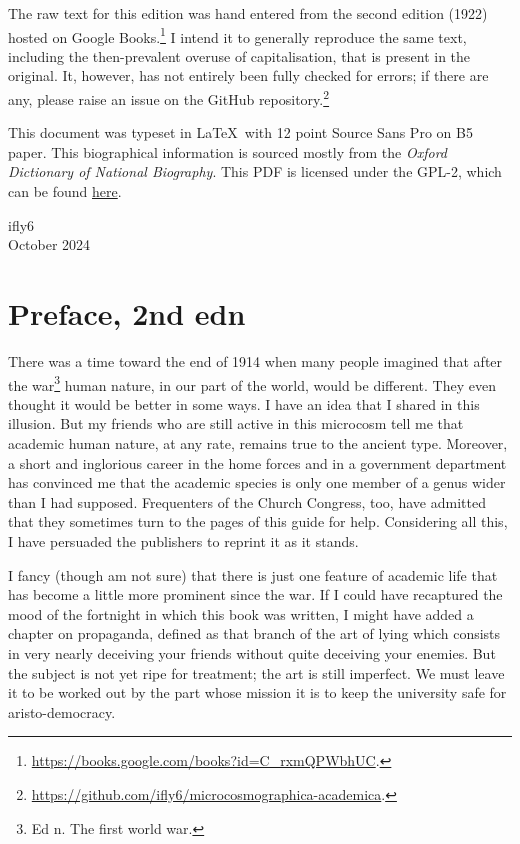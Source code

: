 \documentclass[12pt, oneside, b5paper]{memoir}
\begin{document}
The raw text for this edition was hand entered from the second edition (1922) hosted on Google Books.\footnote{\url{https://books.google.com/books?id=C_rxmQPWbhUC}.} I intend it to generally reproduce the same text, including the then-prevalent overuse of capitalisation, that is present in the original. It, however, has not entirely been fully checked for errors; if there are any, please raise an issue on the GitHub repository.\footnote{\url{https://github.com/ifly6/microcosmographica-academica}.}

This document was typeset in \LaTeX\ with 12 point Source Sans Pro on B5 paper. This biographical information is sourced mostly from the \emph{Oxford Dictionary of National Biography}. This PDF is licensed under the GPL-2, which can be found \href{https://github.com/ifly6/microcsmographica-academica/blob/main/LICENSE}{here}.

\begin{flushright}
	ifly6 \\
	October 2024
\end{flushright}

%

\chapter{Preface, 2nd edn}

There was a time toward the end of 1914 when many people imagined that after the war\footnote{Ed n. The first world war.} human nature, in our part of the world, would be different. They even thought it would be better in some ways. I have an idea that I shared in this illusion. But my friends who are still active in this microcosm tell me that academic human nature, at any rate, remains true to the ancient type. Moreover, a short and inglorious career in the home forces and in a government department has convinced me that the academic species is only one member of a genus wider than I had supposed. Frequenters of the Church Congress, too, have admitted that they sometimes turn to the pages of this guide for help. Considering all this, I have persuaded the publishers to reprint it as it stands.

I fancy (though am not sure) that there is just one feature of academic life that has become a little more prominent since the war. If I could have recaptured the mood of the fortnight in which this book was written, I might have added a chapter on propaganda, defined as that branch of the art of lying which consists in very nearly deceiving your friends without quite deceiving your enemies. But the subject is not yet ripe for treatment; the art is still imperfect. We must leave it to be worked out by the part whose mission it is to keep the university safe for aristo-democracy.
\end{document}
